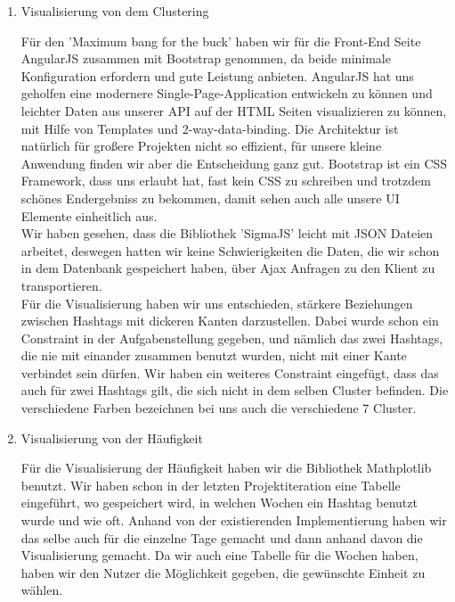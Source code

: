 \begin{enumerate}

\item Visualisierung von dem Clustering

Für den 'Maximum bang for the buck' haben wir für die Front-End Seite AngularJS zusammen mit Bootstrap genommen, da beide minimale Konfiguration erfordern und gute Leistung anbieten. AngularJS hat uns geholfen eine modernere Single-Page-Application entwickeln zu können und leichter Daten aus unserer API auf der HTML Seiten visualizieren zu können, mit Hilfe von Templates und 2-way-data-binding. Die Architektur ist natürlich für großere Projekten nicht so effizient, für unsere kleine Anwendung finden wir aber die Entscheidung ganz gut. Bootstrap ist ein CSS Framework, dass uns erlaubt hat, fast kein CSS zu schreiben und trotzdem schönes Endergebniss zu bekommen, damit sehen auch alle unsere UI Elemente einheitlich aus. \\

Wir haben gesehen, dass die Bibliothek 'SigmaJS' leicht mit JSON Dateien arbeitet, deswegen hatten wir keine Schwierigkeiten die Daten, die wir schon in dem Datenbank gespeichert haben, über Ajax Anfragen zu den Klient zu transportieren. \\ 

Für die Visualisierung haben wir uns entschieden, stärkere Beziehungen zwischen Hashtags mit dickeren Kanten darzustellen. Dabei wurde schon ein Constraint in der Aufgabenstellung gegeben, und nämlich das zwei Hashtags, die nie mit einander zusammen benutzt wurden, nicht mit einer Kante verbindet sein dürfen. Wir haben ein weiteres Constraint eingefügt, dass das auch für zwei Hashtags gilt, die sich nicht in dem selben Cluster befinden. Die verschiedene Farben bezeichnen bei uns auch die verschiedene 7 Cluster.

\item Visualisierung von der Häufigkeit

Für die Visualisierung der Häufigkeit haben wir die Bibliothek Mathplotlib benutzt. Wir haben schon in der letzten Projektiteration eine Tabelle eingeführt, wo gespeichert wird, in welchen Wochen ein Hashtag benutzt wurde und wie oft. Anhand von der existierenden Implementierung haben wir das selbe auch für die einzelne Tage gemacht und dann anhand davon die Visualisierung gemacht. Da wir auch eine Tabelle für die Wochen haben, haben wir den Nutzer die Möglichkeit gegeben, die gewünschte Einheit zu wählen.

\end{enumerate}

